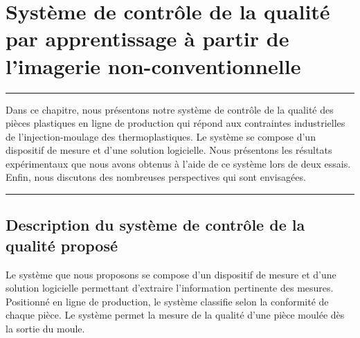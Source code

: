 
\lhead[\fancyplain{}{\leftmark}]%
      {\fancyplain{}{}} %
\chead[\fancyplain{}{}]%
      {\fancyplain{}{}}
\rhead[\fancyplain{}{}]%
      {\fancyplain{}{\rightmark}}%
\lfoot[\fancyplain{}{}]%
      {\fancyplain{}{}}
\cfoot[\fancyplain{}{\thepage}]%
      {\fancyplain{}{\thepage}} %
\rfoot[\fancyplain{}{}]%
     {\fancyplain{}{\scriptsize}}



\chapter{Système de contrôle de la qualité par apprentissage à partir de l’imagerie non-conventionnelle}
\label{ch:theeye}


\begin{center}
\rule{0.7\linewidth}{.5pt}
\begin{minipage}{0.7\linewidth}
\smallskip

	Dans ce chapitre, nous présentons notre système de contrôle de la qualité des pièces plastiques en ligne de production qui répond aux contraintes industrielles de l'injection-moulage des thermoplastiques.
	Le système se compose d'un dispositif de mesure et d'une solution logicielle.
	Nous présentons les résultats expérimentaux que nous avons obtenus à l'aide de ce système lors de deux essais.
	Enfin, nous discutons des nombreuses perspectives qui sont envisagées.

\end{minipage}
\smallskip
\rule{0.7\linewidth}{.5pt}
\end{center}

\minitoc
\newpage

\section{Description du système de contrôle de la qualité proposé} \label{sec:theeye_description}
Le système que nous proposons se compose d’un dispositif de mesure et d’une solution logicielle permettant d’extraire l’information pertinente des mesures.
Positionné en ligne de production, le système classifie selon la conformité de chaque pièce.
Le système permet la mesure de la qualité d’une pièce moulée dès la sortie du moule.

